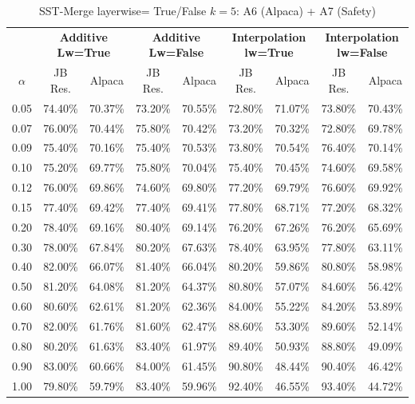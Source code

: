 \begin{table}[h]
\centering
\caption{SST-Merge layerwise= True/False $k=5$: A6 (Alpaca) + A7 (Safety)}
\label{tab:res_a6_a7_sst_5}
\begin{tabular}{c|cc|cc|cc|cc}
\hline
 & \multicolumn{2}{c|}{\textbf{Additive Lw=True}} & \multicolumn{2}{c|}{\textbf{Additive Lw=False}} & \multicolumn{2}{c|}{\textbf{Interpolation lw=True}}& \multicolumn{2}{c}{\textbf{Interpolation lw=False}} \\
$\alpha$ & JB Res. & Alpaca & JB Res. & Alpaca & JB Res. & Alpaca & JB Res. & Alpaca \\
\hline
0.05 & 74.40\% & 70.37\% & 73.20\% & 70.55\% & 72.80\% & 71.07\% & 73.80\% & 70.43\% \\
0.07 & 76.00\% & 70.44\% & 75.80\% & 70.42\% & 73.20\% & 70.32\% & 72.80\% & 69.78\% \\
0.09 & 75.40\% & 70.16\% & 75.40\% & 70.53\% & 73.80\% & 70.54\% & 76.40\% & 70.14\% \\
0.10 & 75.20\% & 69.77\% & 75.80\% & 70.04\% & 75.40\% & 70.45\% & 74.60\% & 69.58\% \\
0.12 & 76.00\% & 69.86\% & 74.60\% & 69.80\% & 77.20\% & 69.79\% & 76.60\% & 69.92\% \\
0.15 & 77.40\% & 69.42\% & 77.40\% & 69.41\% & 77.80\% & 68.71\% & 77.20\% & 68.32\% \\
0.20 & 78.40\% & 69.16\% & 80.40\% & 69.14\% & 76.20\% & 67.26\% & 76.20\% & 65.69\% \\
0.30 & 78.00\% & 67.84\% & 80.20\% & 67.63\% & 78.40\% & 63.95\% & 77.80\% & 63.11\% \\
0.40 & 82.00\% & 66.07\% & 81.40\% & 66.04\% & 80.20\% & 59.86\% & 80.80\% & 58.98\% \\
0.50 & 81.20\% & 64.08\% & 81.20\% & 64.37\% & 80.80\% & 57.07\% & 84.60\% & 56.42\% \\
0.60 & 80.60\% & 62.61\% & 81.20\% & 62.36\% & 84.00\% & 55.22\% & 84.20\% & 53.89\% \\
0.70 & 82.00\% & 61.76\% & 81.60\% & 62.47\% & 88.60\% & 53.30\% & 89.60\% & 52.14\% \\
0.80 & 80.20\% & 61.63\% & 83.40\% & 61.97\% & 89.40\% & 50.93\% & 88.80\% & 49.09\% \\
0.90 & 83.00\% & 60.66\% & 84.00\% & 61.45\% & 90.80\% & 48.44\% & 90.40\% & 46.42\% \\
1.00 & 79.80\% & 59.79\% & 83.40\% & 59.96\% & 92.40\% & 46.55\% & 93.40\% & 44.72\% \\
\hline
\end{tabular}
\end{table}
\FloatBarrier

